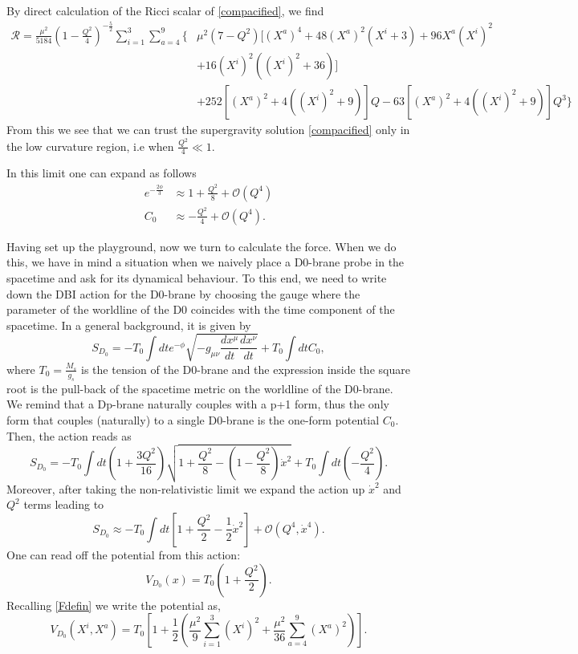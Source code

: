 \documentclass[11pt,english]{article}
\newcommand{\be}{\begin{equation}}
\newcommand{\ee}{\end{equation}}
\def\nn{\nonumber}
\numberwithin{equation}{section}
\begin{document}
By direct calculation of the Ricci scalar of \eqref{compacified}, we find 
\begin{align} \nn
\mathcal{R}=\frac{\mu ^2}{5184}\left(1-\frac{Q^2}{4}\right)^{-\frac{5}{2}}\sum_{i=1}^3\sum_{a=4}^9 \Bigg\{&\mu ^2(7-Q^2) \Big[(X^a)^4+48 (X^a)^2 (X^i+3)+96 X^a (X^i)^2\\
\nn&+16 (X^i)^2 \left((X^i)^2+36\right)\Big]\\ 
&+252 \left[(X^a)^2+4 \left((X^i)^2+9\right)\right] Q-63 \left[(X^a)^2+4 \left((X^i)^2+9\right)\right] Q^3 \Bigg\}
\end{align}
From this we see that we can trust the supergravity solution \eqref{compacified} only in the low curvature region, i.e when $\frac{Q^2}{4}\ll 1$. 

\noindent
In this limit one can expand as follows 
\begin{align}\nn
 e^{-\frac{2\phi}{3}}&\approx 1+\frac{Q^2}{8}+\mathcal{O}\left(Q^4\right)\\
 \nn C_0&\approx-\frac{Q^2}{4} +\mathcal{O}\left(Q^4\right).
\end{align}

Having set up the playground, now we turn to calculate the force. When we do this, we have in mind a situation when we naively place a D0-brane probe in the spacetime and ask for its dynamical behaviour. To this end, we need to write down the DBI action for the D0-brane by choosing the gauge where the parameter of the worldline of the D0 coincides with the time component of the spacetime. In a general background, it is given by 
\be\label{bosonicpart}
S_{D_0}=-T_0\int dt e^{-\phi}\sqrt{-g_{\mu\nu}\frac{dx^\mu }{dt}\frac{dx^\nu}{dt}}+T_0\int dt C_0,
\ee
where $T_0=\frac{M_s}{g_s}$ is the tension of the D0-brane and the expression inside the square root is the pull-back of the spacetime metric on the worldline of the D0-brane. We remind that a Dp-brane naturally couples with a p+1 form, thus the only form that couples (naturally) to a single D0-brane is the one-form potential $C_0$.  Then, the action reads as 
\be 
S_{D_0}=-T_0\int dt \left(1+\frac{3Q^2}{16}\right)\sqrt{1+\frac{Q^2}{8}-\left(1-\frac{Q^2}{8}\right)\dot{x}^2}+T_0\int dt \left(-\frac{Q^2}{4}\right).
\ee
Moreover, after taking the non-relativistic limit we expand the action up $\dot{x}^2$ and $Q^2$ terms leading to
\be 
S_{D_0}\approx-T_0\int dt\left[1+\frac{Q^2}{2}-\frac{1}{2}\dot{x}^2\right] +\mathcal{O}(Q^4,\dot{x}^4).
\ee
One can read off the potential from this action:
\be \label{potential1}
V_{D_0}(x)=T_0(1+\frac{Q^2}{2}).
\ee
Recalling \eqref{Fdefin} we write the potential as, 
\be 
V_{D_0}(X^i,X^a)=T_0\left[1+\frac{1}{2}\left(\frac{\mu^2}{9}\sum_{i=1}^3(X^i)^2+\frac{\mu^2}{36}\sum_{a=4}^9(X^a)^2\right)\right].
\ee
\end{document}
